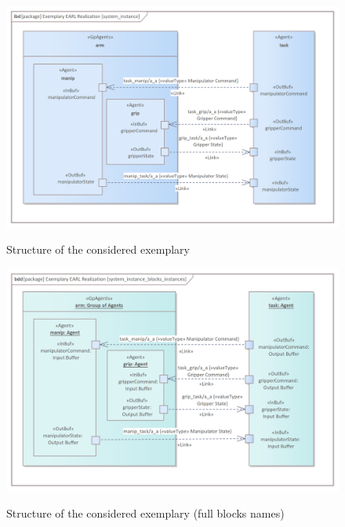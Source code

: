\documentclass[11pt,oneside,a4paper]{article}
\begin{document}
	\begin{figure}[H]
		\centering
		\begin{center}
			{\includegraphics[width=.9\columnwidth]{img/basic_earl_instance/system_instance.png}}
		\end{center}
		\caption{Structure of the considered exemplary \System{}}
		\label{fig:all_agents}
	\end{figure}
	
	
	
	\begin{figure}[H]
	\centering
	\begin{center}
		{\includegraphics[width=.9\columnwidth]{img/basic_earl_instance/system_instance_blocks_instances.png}}
	\end{center}
	\caption{Structure of the considered exemplary \System{} (full blocks names)}
	\label{fig:all_agents_blocks_instances}
\end{figure}	
	
	
	
\end{document}
